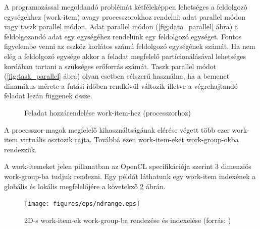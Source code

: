 	A programozással megoldandó problémát kétféleképpen lehetséges a feldolgozó
	egységekhez (work-item) avagy processzorokhoz rendelni:
	adat parallel módon vagy taszk parallel módon.
	Adat parallel módon (\ref{fig:data_parallel} ábra) a feldolgozandó adat egy
	egységéhez rendelünk egy feldolgozó egységet. Fontos figyelembe venni az eszköz korlátos
	számú feldolgozó egységének számát. Ha nem elég a feldolgozó egysége akkor a
	feladat megfelelő partícionálásával lehetséges kordában tartani a szükséges
	erőforrás számát.
	Taszk parallel módot (\ref{fig:task_parallel} ábra) olyan esetben célszerű
	használna, ha a bemenet dinamikus mérete a futási időben rendkívül változik
	illetve a végrehajtandó feladat lezán függenek össze.
	
	\begin{figure}[!h]
		\centering
		\hfil
		\caption{Feladat hozzárendelése work-item-hez (processzorhoz)}
		\label{fig:parallel}
	\end{figure}
	A processzor-magok megfelelő kihasználtságának elérése végett több ezer
	work-item virtuális osztozik rajta.
	Továbbá ezen work-item-eket work-group-okba rendezzük.
	
	A work-itemeket jelen pillanatban az OpenCL specifikációja szerint 3 dimenziós work-group-ba tudjuk
	rendezni. Egy példát láthatunk egy work-item indexének a globális és lokális megfelelőjére a
	követekző \ref{fig:ndrange} ábrán.
	
	\begin{figure}[!h]
		\centering
		\texttt{[image: figures/eps/ndrange.eps]}
		\caption{2D-s work-item-ek work-group-ba rendezése és indexelése (forrás: \cite{opencl})} 
		\label{fig:ndrange} 
	\end{figure}

